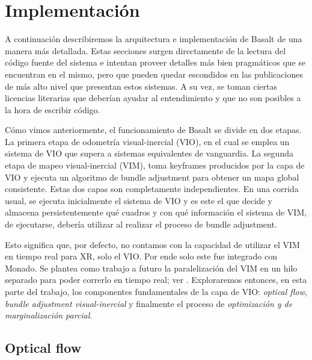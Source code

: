 \documentclass[ twoside,openright,titlepage,numbers=noenddot,%
                headinclude,footinclude,cleardoublepage=empty,abstract=on,
                BCOR=-5mm,paper=a4,fontsize=11pt
                ]{scrreprt}
\begin{document}
\hypertarget{implementaciuxf3n}{%
\section{Implementación}\label{implementaciuxf3n}}

A continuación describiremos la arquitectura e implementación de Basalt
de una manera más detallada. Estas secciones surgen directamente de la
lectura del código fuente del sistema e intentan proveer detalles más
bien pragmáticos que se encuentran en el mismo, pero que pueden quedar
escondidos en las publicaciones de más alto nivel que presentan estos
sistemas. A su vez, se toman ciertas licencias literarias que deberían
ayudar al entendimiento y que no son posibles a la hora de escribir
código.

Cómo vimos anteriormente, el funcionamiento de Basalt se divide en dos
etapas. La primera etapa de odometría visual-inercial (VIO), en el cual
se emplea un sistema de VIO que supera a sistemas equivalentes de
vanguardia. La segunda etapa de mapeo visual-inercial (VIM), toma
keyframes producidos por la capa de VIO y ejecuta un algoritmo de bundle
adjustment para obtener un mapa global consistente. Estas dos capas son
completamente independientes. En una corrida usual, se ejecuta
inicialmente el sistema de VIO y es este el que decide y almacena
persistentemente qué cuadros y con qué información el sistema de VIM, de
ejecutarse, debería utilizar al realizar el proceso de bundle
adjustment.

Esto significa que, por defecto, no contamos con la capacidad de
utilizar el VIM en tiempo real para XR, solo el VIO. Por ende solo este
fue integrado con Monado. Se plantea como trabajo a futuro la
paralelización del VIM en un hilo separado para poder correrlo en tiempo
real; ver . Exploraremos entonces, en esta
parte del trabajo, los componentes fundamentales de la capa de VIO:
\emph{optical flow}, \emph{bundle adjustment visual-inercial} y
finalmente el proceso de \emph{optimización y de marginalización
parcial}.

\hypertarget{optical-flow}{%
\subsection{Optical flow}\label{optical-flow}}
\end{document}
